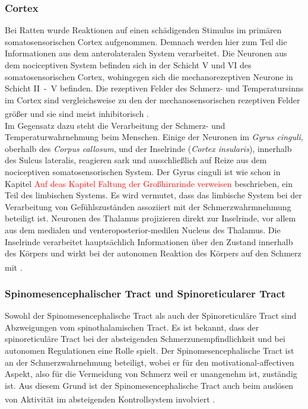 \documentclass[12pt,a4paper,pdftex]{article}
\begin{document}
\subsubsection*{Cortex}
Bei Ratten wurde Reaktionen auf einen schädigenden Stimulus im primären somatosensorischen Cortex aufgenommen. Demnach werden hier zum Teil die Informationen aus dem anterolateralen System verarbeitet. Die Neuronen aus dem nociceptiven System befinden sich in der Schicht V und VI des somatosensorischen Cortex, wohingegen sich die mechanorezeptiven Neurone in Schicht II~-~V befinden. Die rezeptiven Felder des Schmerz- und Temperatursinns im Cortex sind vergleichsweise zu den der mechanosensorischen rezeptiven Felder größer und sie sind meist inhibitorisch \textsuperscript{\cite[25]{paxinos2014rat}}.
\\
\noindent Im Gegensatz dazu steht die Verarbeitung der Schmerz- und  Temperaturwahrnehmung beim Menschen. Einige der Neuronen im \textit{Gyrus cinguli}, oberhalb des \textit{Corpus callosum}, und der Inselrinde (\textit{Cortex insularis}), innerhalb des Sulcus lateralis, reagieren sark und ausschließlich auf Reize aus dem nociceptiven somatosensorischen System. Der Gyrus cinguli ist wie schon in Kapitel \textcolor{red}{Auf deas Kapitel Faltung der Großhirnrinde verweisen} beschrieben, ein Teil des limbischen Systems. Es wird vermutet, dass das limbische System bei der Verarbeitung von Gefühlszuständen assoziiert mit der Schmerzwahrmnehmung beteiligt ist. Neuronen des Thalamus projizieren direkt zur Inselrinde, vor allem aus dem medialen und venteroposterior-medilen Nucleus des Thalamus. Die Inselrinde verarbeitet hauptsächlich Informationen über den Zustand innerhalb des Körpers und wirkt bei der autonomen Reaktion des Körpers auf den Schmerz mit \textsuperscript{\cite[24]{kandel2013principles}}.

\subsubsection*{Spinomesencephalischer Tract und  Spinoreticularer Tract}

Sowohl der Spinomesencephalische Tract als auch der Spinoreticuläre Tract sind Abzweigungen vom spinothalamischen Tract. Es ist bekannt, dass der spinoreticuläre Tract bei der absteigenden Schmerzunempfindlichkeit und bei autonomen Regulationen eine Rolle spielt. Der Spinomesencephalische Tract ist an der Schmerzwahrnehmung beteiligt, wobei er für den motivational-affectiven Aspekt, also für die Vermeidung von Schmerz weil er unangenehm ist, zuständig ist. Aus diesem Grund ist der Spinomesencephalische Tract auch beim auslösen von Aktivität im absteigenden Kontrollsystem involviert \textsuperscript{\cite[24]{kandel2013principles}}.
\end{document}
